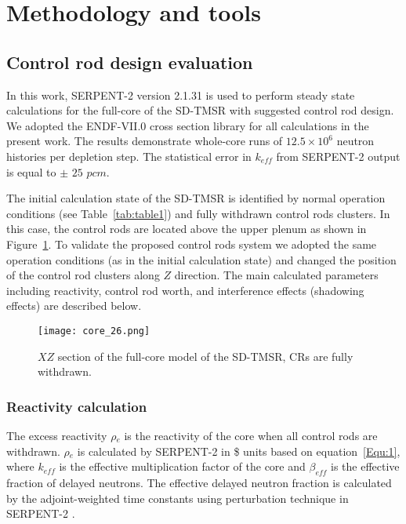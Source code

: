 \section{Methodology and tools} \label{Methodology-and-tools}
\subsection{Control rod design evaluation}
In this work, SERPENT-2 version 2.1.31 \cite{leppanen2014serpent} is used to 
perform steady state calculations for the full-core of the SD-TMSR with 
suggested control rod design. We adopted the ENDF-VII.0 cross section library 
for all calculations in the present work. The results demonstrate whole-core 
runs of $12.5\times 10^6$ neutron histories per depletion step. The 
statistical error in $k_{eff}$ from SERPENT-2 output is equal to $\pm$ $25$ 
$pcm$.

The initial calculation state of the SD-TMSR is identified by normal operation 
conditions (see Table~\ref{tab:table1}) and fully withdrawn control rods 
clusters. In this case, the control rods are located above the upper plenum as 
shown in Figure~\ref{fig:core_26}. To validate the proposed control rods 
system we adopted the same operation conditions (as in the initial calculation 
state) and changed the position of the control rod clusters along $Z$ 
direction. The main calculated parameters including reactivity, control rod 
worth, and interference effects (shadowing effects) are described below.

\begin{figure}[t!] %
	\centering
	\texttt{[image: core\_26.png]}
	\caption{$XZ$ section of the full-core model of the SD-TMSR, CRs are fully withdrawn.}
	\label{fig:core_26}
\end{figure}

\subsubsection{Reactivity calculation}

The excess reactivity $\rho$$_e$ is the reactivity of the core when all control rods are withdrawn. $\rho$$_e$ is calculated by SERPENT-2 in \$ units based on equation~\ref{Equ:1}, where $k_{eff}$ is the effective multiplication factor of the core and $\beta_{eff}$ is the effective fraction of delayed neutrons. The effective delayed neutron fraction is calculated by the adjoint-weighted time constants using perturbation technique in SERPENT-2 \cite{leppanen2014calculation}.

